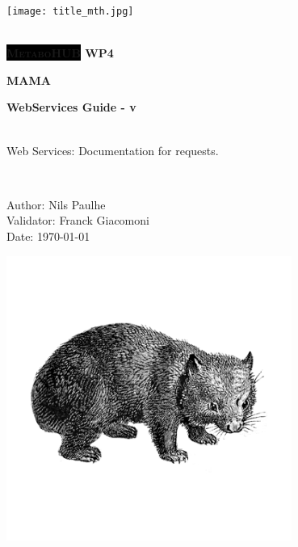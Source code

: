 
\begin{titlepage}

\begin{center}

\texttt{[image: title\_mth.jpg]}\\[1cm] 

\HRule \\[0.4cm]
\begin{center} { \textsc{\large { \huge \bfseries \colorbox{Black}{\color{White}Metabo{\color{mthRed}HUB}} WP4 \\}} } \end{center} %
\begin{center} { \textsc{\large { \huge \bfseries MAMA}} } \end{center} %
\begin{center} { \huge \bfseries WebServices Guide - v \ReleaseVersion} \end{center} 

\HRule \\[0.4cm]

 \large Web Services: Documentation for requests. %

\HRule \\[1.5cm]

\begin{flushleft}
 \large
Author: Nils Paulhe \\[\baselineskip]
Validator: Franck Giacomoni \\[\baselineskip]
Date: \today

\let\thefootnote\relax
{}

\end{flushleft}

\vfill
\includegraphics[width=0.7\textwidth]{./files/images/wombat.png}

\end{center}

\end{titlepage}
